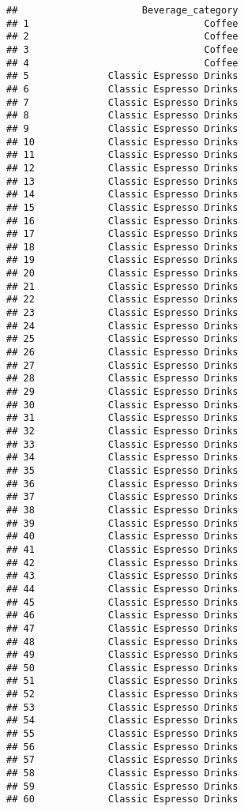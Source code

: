 \documentclass[
]{article}
\begin{document}
\begin{verbatim}
##                      Beverage_category
## 1                               Coffee
## 2                               Coffee
## 3                               Coffee
## 4                               Coffee
## 5              Classic Espresso Drinks
## 6              Classic Espresso Drinks
## 7              Classic Espresso Drinks
## 8              Classic Espresso Drinks
## 9              Classic Espresso Drinks
## 10             Classic Espresso Drinks
## 11             Classic Espresso Drinks
## 12             Classic Espresso Drinks
## 13             Classic Espresso Drinks
## 14             Classic Espresso Drinks
## 15             Classic Espresso Drinks
## 16             Classic Espresso Drinks
## 17             Classic Espresso Drinks
## 18             Classic Espresso Drinks
## 19             Classic Espresso Drinks
## 20             Classic Espresso Drinks
## 21             Classic Espresso Drinks
## 22             Classic Espresso Drinks
## 23             Classic Espresso Drinks
## 24             Classic Espresso Drinks
## 25             Classic Espresso Drinks
## 26             Classic Espresso Drinks
## 27             Classic Espresso Drinks
## 28             Classic Espresso Drinks
## 29             Classic Espresso Drinks
## 30             Classic Espresso Drinks
## 31             Classic Espresso Drinks
## 32             Classic Espresso Drinks
## 33             Classic Espresso Drinks
## 34             Classic Espresso Drinks
## 35             Classic Espresso Drinks
## 36             Classic Espresso Drinks
## 37             Classic Espresso Drinks
## 38             Classic Espresso Drinks
## 39             Classic Espresso Drinks
## 40             Classic Espresso Drinks
## 41             Classic Espresso Drinks
## 42             Classic Espresso Drinks
## 43             Classic Espresso Drinks
## 44             Classic Espresso Drinks
## 45             Classic Espresso Drinks
## 46             Classic Espresso Drinks
## 47             Classic Espresso Drinks
## 48             Classic Espresso Drinks
## 49             Classic Espresso Drinks
## 50             Classic Espresso Drinks
## 51             Classic Espresso Drinks
## 52             Classic Espresso Drinks
## 53             Classic Espresso Drinks
## 54             Classic Espresso Drinks
## 55             Classic Espresso Drinks
## 56             Classic Espresso Drinks
## 57             Classic Espresso Drinks
## 58             Classic Espresso Drinks
## 59             Classic Espresso Drinks
## 60             Classic Espresso Drinks

\end{verbatim}
\end{document}
